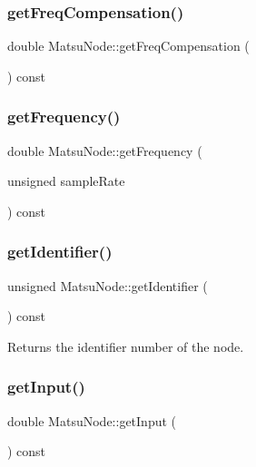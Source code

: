 \subsubsection{\texorpdfstring{get\+Freq\+Compensation()}{getFreqCompensation()}}
{\footnotesize\ttfamily double Matsu\+Node\+::get\+Freq\+Compensation (\begin{DoxyParamCaption}{ }\end{DoxyParamCaption}) const}

\mbox{\label{classMatsuNode_af302351e0775abe90c5e2eb40a5a9035}} 
\subsubsection{\texorpdfstring{get\+Frequency()}{getFrequency()}}
{\footnotesize\ttfamily double Matsu\+Node\+::get\+Frequency (\begin{DoxyParamCaption}\item[{unsigned}]{sample\+Rate }\end{DoxyParamCaption}) const}

\mbox{\label{classMatsuNode_ac0c4e1164c131fce54db22db8384ac7d}} 
\subsubsection{\texorpdfstring{get\+Identifier()}{getIdentifier()}}
{\footnotesize\ttfamily unsigned Matsu\+Node\+::get\+Identifier (\begin{DoxyParamCaption}{ }\end{DoxyParamCaption}) const}



Returns the identifier number of the node. 

\mbox{\label{classMatsuNode_a15a4350b73d7466d8ff7565b19fd7cb5}} 
\subsubsection{\texorpdfstring{get\+Input()}{getInput()}}
{\footnotesize\ttfamily double Matsu\+Node\+::get\+Input (\begin{DoxyParamCaption}{ }\end{DoxyParamCaption}) const}



